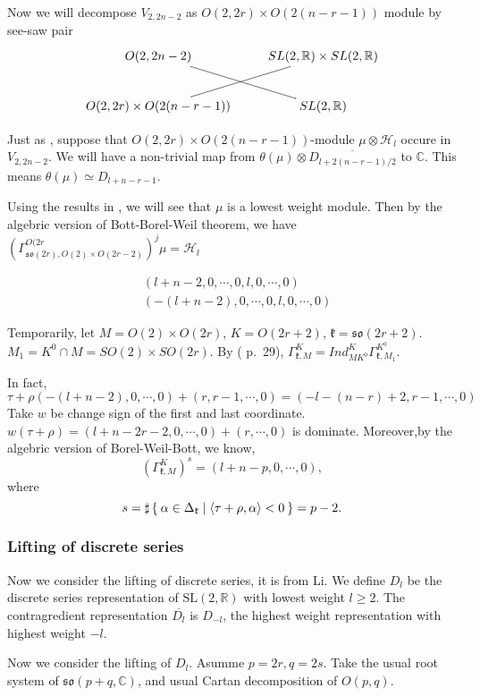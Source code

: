 \documentclass[12pt]{article}
\def\bR{{\mathbb{R}}}
\def\bC{{\mathbb{C}}}
\def\inn#1#2{\left\langle{#1},{#2}\right\rangle}
\def\SL{{\rm SL}}
\def\aso{\mathfrak{so}}
\def\fkk{\mathfrak{k}}
\def\chh{\mathcal{H}}
\def\SL{\mathrm{SL}}
\begin{document}
Now we will decompose $V_{2,2n-2}$ as $O(2,2r)\times O(2(n-r-1))$ module
 by see-saw pair
\[
\xymatrix{
O(2,2n-2) \ar@{-}[dr]& SL(2,\bR)\times SL(2,\bR) \\
O(2,2r)\times O(2(n-r-1))\ar@{-}[ur] & SL(2,\bR)}
\]

Just as \cite{ZhuHuang1997}, suppose that $O(2,2r)\times O(2(n-r-1))$-module 
$\mu \otimes \chh_l$ occure in $V_{2,2n-2}$.
We will have a non-trivial map from 
$\theta(\mu)\otimes \overline{D_{l+2(n-r-1)/2}}$ to $\bC$. 
This means $\theta(\mu)\simeq D_{l+n-r-1}$. 

Using the results in \cite{Howe1979Opq}, we will see that $\mu$ is a lowest 
weight module. Then by the algebric version of Bott-Borel-Weil theorem, 
we have $(\Gamma_{\aso(2r),O(2)\times O(2r-2)}^{O(2r})^j \mu = \chh_l$

\begin{align*}
&(l+n-2, 0,\cdots, 0, l, 0, \cdots,0)\\
&(-(l+n-2), 0, \cdots, 0,l , 0, \cdots, 0)
\end{align*}

Temporarily, let $M = O(2)\times O(2r)$, $K = O(2r+2)$, $\fkk = \aso(2r+2)$. 
$M_1 = K^0\cap M = SO(2)\times SO(2r)$.
By (\cite{BorelWallach2000} p.~29), 
$\Gamma_{\fkk,M}^{K} = Ind_{MK^0}^K\Gamma_{\fkk,M_1}^{K^0}$.


In fact, 
\[
\tau+\rho(-(l+n-2),0,\cdots, 0) + (r,r-1, \cdots, 0)
= (-l-(n-r)+2,r-1, \cdots, 0)
\]
Take $w$ be change sign of the first and last coordinate. 
$w(\tau+\rho)= (l+n-2r-2, 0, \cdots, 0) + (r,\cdots, 0)$ is dominate.
Moreover,by the algebric version of Borel-Weil-Bott, we know, 
\[
(\Gamma_{\fkk,M}^K)^s = (l+n-p,0, \cdots, 0),
\]
where 
\[
s = \sharp\Set{\alpha\in \Delta_\fkk|\inn{\tau+\rho}{\alpha}<0}
= p-2.
\]


\subsubsection{Lifting of discrete series}


Now we consider the lifting of discrete series, it is from Li\cite{Li1990}.
We define $D_l$ be the discrete series representation of $\SL(2,\bR)$ with 
lowest weight $l\geq 2$. The contragredient representation $\overline{D_l}$ is 
$D_{-l}$, the highest weight representation with highest weight $-l$.

Now we consider the lifting of $D_{l}$.
Asumme $p=2r, q=2s$.
Take the usual root system of $\aso(p+q,\bC)$, and usual Cartan decomposition
of $O(p,q)$. 
\end{document}
